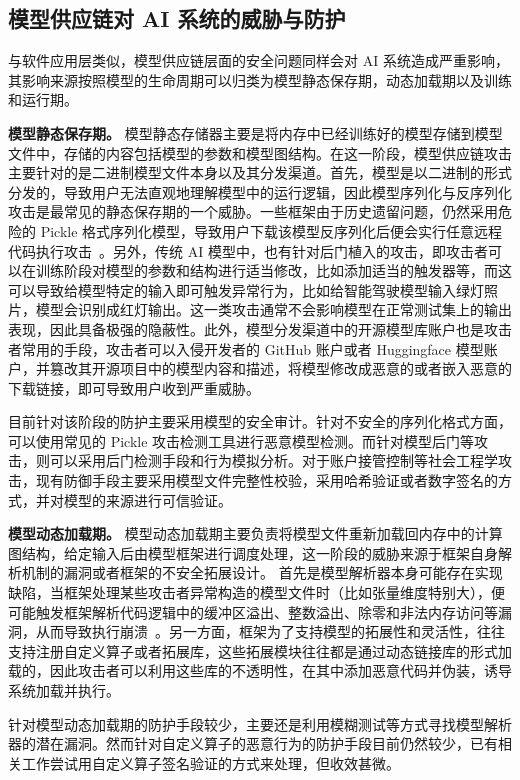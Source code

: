 \subsection{模型供应链对 AI 系统的威胁与防护}
与软件应用层类似，模型供应链层面的安全问题同样会对 AI 系统造成严重影响，其影响来源按照模型的生命周期可以归类为模型静态保存期，动态加载期以及训练和运行期。

\textbf{模型静态保存期。}
模型静态存储器主要是将内存中已经训练好的模型存储到模型文件中，存储的内容包括模型的参数和模型图结构。在这一阶段，模型供应链攻击主要针对的是二进制模型文件本身以及其分发渠道。首先，模型是以二进制的形式分发的，导致用户无法直观地理解模型中的运行逻辑，因此模型序列化与反序列化攻击是最常见的静态保存期的一个威胁。一些框架由于历史遗留问题，仍然采用危险的 Pickle 格式序列化模型，导致用户下载该模型反序列化后便会实行任意远程代码执行攻击~\cite{huntr_report_2026,penligent_article_2025,hackernews-sleepy-pickle, github-pickle-attacks, trailofbits-pickle-attacks}。另外，传统 AI 模型中，也有针对后门植入的攻击，即攻击者可以在训练阶段对模型的参数和结构进行适当修改，比如添加适当的触发器等，而这可以导致给模型特定的输入即可触发异常行为，比如给智能驾驶模型输入绿灯照片，模型会识别成红灯输出。这一类攻击通常不会影响模型在正常测试集上的输出表现，因此具备极强的隐蔽性。此外，模型分发渠道中的开源模型库账户也是攻击者常用的手段，攻击者可以入侵开发者的 GitHub 账户或者  Huggingface 模型账户，并篡改其开源项目中的模型内容和描述，将模型修改成恶意的或者嵌入恶意的下载链接，即可导致用户收到严重威胁。

目前针对该阶段的防护主要采用模型的安全审计。针对不安全的序列化格式方面，可以使用常见的 Pickle 攻击检测工具进行恶意模型检测。而针对模型后门等攻击，则可以采用后门检测手段和行为模拟分析。对于账户接管控制等社会工程学攻击，现有防御手段主要采用模型文件完整性校验，采用哈希验证或者数字签名的方式，并对模型的来源进行可信验证。

\textbf{模型动态加载期。}
模型动态加载期主要负责将模型文件重新加载回内存中的计算图结构，给定输入后由模型框架进行调度处理，这一阶段的威胁来源于框架自身解析机制的漏洞或者框架的不安全拓展设计。
首先是模型解析器本身可能存在实现缺陷，当框架处理某些攻击者异常构造的模型文件时（比如张量维度特别大），便可能触发框架解析代码逻辑中的缓冲区溢出、整数溢出、除零和非法内存访问等漏洞，从而导致执行崩溃~\cite{huntr_platform_2024}。另一方面，框架为了支持模型的拓展性和灵活性，往往支持注册自定义算子或者拓展库，这些拓展模块往往都是通过动态链接库的形式加载的，因此攻击者可以利用这些库的不透明性，在其中添加恶意代码并伪装，诱导系统加载并执行。

针对模型动态加载期的防护手段较少，主要还是利用模糊测试等方式寻找模型解析器的潜在漏洞。然而针对自定义算子的恶意行为的防护手段目前仍然较少，已有相关工作尝试用自定义算子签名验证的方式来处理，但收效甚微。

